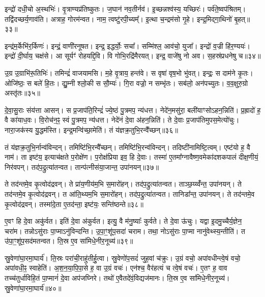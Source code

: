 इन्द्रो॑ दधी॒चो अ॒स्थभिः॑।
वृ॒त्राण्यप्र॑तिष्कुतः।
ज॒घान॑ नव॒तीर्नव॑।
इ॒च्छन्नश्व॑स्य॒ यच्छिरः॑।
पर्व॑ते॒ष्वप॑श्रितम्।
तद्वि॑दच्छर्य॒णाव॑ति।
अत्राह॒ गोरम॑न्वत।
नाम॒ त्वष्टु॑रपी॒च्यम्᳚।
इ॒त्था च॒न्द्रम॑सो गृ॒हे।
इन्द्र॒मिद्गा॒थिनो॑ बृ॒हत्॥३३॥

इन्द्र॑म॒र्केभि॑र॒र्किणः॑।
इन्द्रं॒ वाणी॑रनूषत।
इन्द्र॒ इद्धर्योः॒ सचा᳚।
सम्मि॑श्ल॒ आव॑चो॒ युजा᳚।
इन्द्रो॑ व॒ज्री हि॑र॒ण्ययः॑।
इन्द्रो॑ दी॒र्घाय॒ चक्ष॑से।
आ सूर्यꣳ॑ रोहयद्दि॒वि।
वि गोभि॒रद्रि॑मैरयत्।
इन्द्र॒ वाजे॑षु नो अव।
स॒हस्र॑प्रधनेषु च॥३४॥

उ॒ग्र उ॒ग्राभि॑रू॒तिभिः॑।
तमिन्द्रं॑ वाजयामसि।
म॒हे वृ॒त्राय॒ हन्त॑वे।
स वृषा॑ वृष॒भो भु॑वत्।
इन्द्रः॒ स दाम॑ने कृ॒तः।
ओजि॑ष्ठः॒ स बले॑ हि॒तः।
द्यु॒म्नी श्लो॒की स सौ॒म्यः॑।
गि॒रा वज्रो॒ न सम्भृ॑तः।
सब॑लो॒ अन॑पच्युतः।
व॒व॒क्षुरु॒ग्रो अस्तृ॑तः॥३५॥\anuvakamend[बृ॒हच्चास्तृ॑तः]

दे॒वा॒सु॒राः संय॑त्ता आसन्।
स प्र॒जा\-प॑ति॒रिन्द्रं॑ ज्ये॒ष्ठं पु॒त्रमप॒ न्य॑धत्त।
नेदे॑न॒मसु॑रा॒ बली॑याꣳसो\-ऽहन॒न्निति॑।
प्र॒ह्रादो॑ ह॒ वै का॑याध॒वः।
वि॒रोच॑न॒ꣴ॒ स्वं पु॒त्रमप॒ न्य॑धत्त।
नेदे॑नं दे॒वा अ॑हन॒न्निति॑।
ते दे॒वाः प्र॒जा\-प॑तिमुपस॒मेत्यो॑चुः।
नारा॒जक॑स्य यु॒द्धम॑स्ति।
इन्द्र॒मन्वि॑च्छा॒मेति॑।
तं य॑ज्ञक्र॒तुभि॒रन्वै᳚च्छन्॥३६॥

तं य॑ज्ञक्र॒तुभि॒र्नान्व॑विन्दन्।
तमिष्टि॑भि॒रन्वै᳚च्छन्।
तमिष्टि॑भि॒रन्व॑\-विन्दन्।
तदिष्टी॑नामिष्टि॒\-त्वम्।
एष्ट॑यो ह॒ वै नाम॑।
ता इष्ट॑य॒ इत्याच॑क्षते प॒रोक्षे॑ण।
प॒रोक्ष॑प्रिया इव॒ हि दे॒वाः।
तस्मा॑ ए॒तमा᳚ग्नावैष्ण॒वमेका॑\-दश\-कपालं दीक्ष॒णीयं॒ निर॑वपन्।
तद॑प॒द्रुत्या॑तन्वत।
तान्प॑त्नीसंया॒जान्त॒ उपा॑नयन्॥३७॥

ते तद॑न्तमे॒व कृ॒त्वोद॑द्रवन्।
ते प्रा॑य॒णीय॑म॒भि स॒मारो॑हन्।
तद॑प॒द्रुत्या॑\-तन्वत।
ताञ्छ॒य्य्वँ॑न्त॒ उपा॑नयन्।
ते तद॑न्तमे॒व कृ॒त्वोद॑द्रवन्।
त आ॑ति॒थ्यम॒भि स॒मारो॑हन्।
तद॑प॒द्रुत्या॑\-तन्वत।
तानिडा᳚न्त॒ उपा॑नयन्।
ते तद॑न्तमे॒व कृ॒त्वोद॑द्रवन्।
तस्मा॑दे॒ता ए॒तद॑न्ता॒ इष्ट॑यः॒ सन्ति॑ष्ठन्ते॥३८॥

ए॒वꣳ हि दे॒वा अकु॑र्वत।
इति॑ दे॒वा अ॑कुर्वत।
इत्यु॒ वै म॑नु॒ष्याः᳚ कुर्वते।
ते दे॒वा ऊ॑चुः।
यद्वा इ॒दमु॒च्चैर्य॒ज्ञेन॒ चरा॑म।
तन्नो\-ऽसु॑राः पा॒प्मा\-ऽनु॑विन्दन्ति।
उ॒पा॒ꣳ॒शू॑प॒सदा॑ चराम।
तथा॒ नोऽसु॑राः पा॒प्मा नानु॑वेथ्स्य॒न्तीति॑।
त उ॑पा॒ꣳ॒शू॑प॒सद॑मतन्वत।
ति॒स्र ए॒व सा॑मिधे॒नीर॒नूच्य॑॥३९॥

स्रु॒वेणा॑घा॒रमा॒घार्य॑।
ति॒स्रः परा॑ची॒राहु॑तीर्\mbox{}हु॒त्वा।
स्रु॒वेणो॑प॒सदं॑ जुह॒वां च॑क्रुः।
उ॒ग्रं वचो॒ अपा॑वधीन्त्वे॒षं वचो॒ अपा॑वधी॒ꣴ॒ स्वाहेति॑।
अ॒श॒न॒या॒पि॒पा॒से ह॒ वा उ॒ग्रं वचः॑।
एन॑श्च॒ वैर॑हत्यं च त्वे॒षं वचः॑।
ए॒तꣳ ह॒ वाव तच्च॑तुर्धाविहि॒तं पा॒प्मानं॑ दे॒वा अप॑जघ्निरे।
तथो॑ ए॒वैतदे॑वं॒विद्यज॑मानः।
ति॒स्र ए॒व सा॑मिधे॒नीर॒नूच्य॑।
स्रु॒वेणा॑घा॒रमा॒घार्य॑॥४०॥

